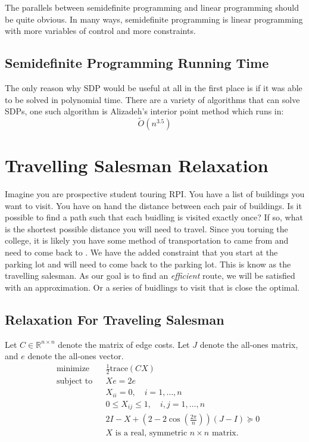 \documentclass{article}
\begin{document}
The parallels between semidefinite programming and linear programming should be quite obvious.
In many ways, semidefinite programming is linear programming with more variables of control and more constraints.

\subsection{Semidefinite Programming Running Time}
The only reason why SDP would be useful at all in the first place is if it was
able to be solved in polynomial time. There are a variety of algorithms that can
solve SDPs, one such algorithm is Alizadeh's interior point method which runs in:
\[ \tilde{O}(n^{3.5}) \]

\section{Travelling Salesman Relaxation}   %
Imagine you are prospective student touring RPI. You have a list of buildings you want to visit.
You have on hand the distance between each pair of buildings. 
Is it possible to find a path such that each buidling is visited exactly once? 
If so, what is the shortest possible distance you will need to travel. 
Since you toruing the college, it is likely you have some method of transportation to came from and need to come back to . 
We have the added constraint that you start at the parking lot and will need to come back to the parking lot.
This is know as the travelling salesman.
As our goal is to find an \emph{efficient} route, we will be satisfied with an approximation. 
Or a series of buidlings to visit that is close the optimal.
\subsection{Relaxation For Traveling Salesman}
Let $C \in \mathbb{R}^{n \times n}$ denote the matrix of edge costs. Let $J$ denote the all-ones matrix, and $e$ denote the all-ones vector.
\begin{equation*}
\begin{aligned}
& {\text{minimize}}
& & \frac{1}{2}\text{trace}(CX) \\
& \text{subject to}
& & Xe = 2e \\
&&& X_{ii} = 0, \quad i = 1,\ldots,n\\
&&& 0 \leq X_{ij} \leq 1, \quad i,j = 1,\ldots,n \\
&&& 2I - X + (2-2\cos\left(\frac{2\pi}{n}\right))(J-I) \succeq 0 \\
&&& X \text{ is a real, symmetric } n \times n \text{ matrix}.
\end{aligned}
\end{equation*}
\end{document}
